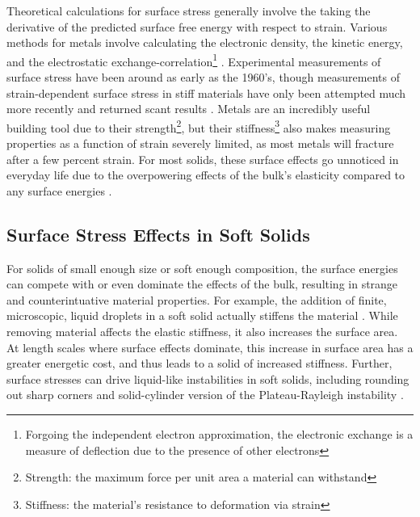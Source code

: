 Theoretical calculations for surface stress generally involve the taking the derivative of the predicted surface free energy with respect to strain. Various methods for metals involve calculating the electronic density, the kinetic energy, and the electrostatic exchange-correlation\footnote{Forgoing the independent electron approximation, the electronic exchange is a measure of deflection due to the presence of other electrons} \cite{GURTIN1978431}. Experimental measurements of surface stress have been around as early as the 1960's, though measurements of strain-dependent surface stress in stiff materials have only been attempted much more recently and returned scant results \cite{mays1968surface,wasserman1970determination,hanneman1962elastic,martinez1990direct,schell1990mechanical}. Metals are an incredibly useful building tool due to their strength\footnote{Strength: the maximum force per unit area a material can withstand}, but their stiffness\footnote{Stiffness: the material's resistance to deformation via strain} also makes measuring properties as a function of strain severely limited, as most metals will fracture after a few percent strain. For most solids, these surface effects go unnoticed in everyday life due to the overpowering effects of the bulk's elasticity compared to any surface energies \cite{miller2000size,dingreville2005surface,duan2005eshelby,sharma2004size,he2008surface,lu2014towards}.



\subsection{Surface Stress Effects in Soft Solids}
For solids of small enough size or soft enough composition, the surface energies can compete with or even dominate the effects of the bulk, resulting in strange and counterintuative material properties. For example, the addition of finite, microscopic, liquid droplets in a soft solid actually stiffens the material \cite{style2015stiffening}. While removing material affects the elastic stiffness, it also increases the surface area. At length scales where surface effects dominate, this increase in surface area has a greater energetic cost, and thus leads to a solid of increased stiffness. Further, surface stresses can drive liquid-like instabilities in soft solids, including rounding out sharp corners \cite{mora2015softening} and solid-cylinder version of the Plateau-Rayleigh instability \cite{mora2010capillarity}.

